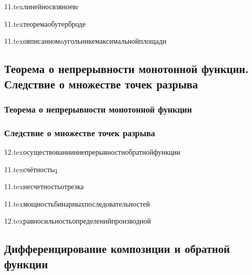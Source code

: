 {11.tex}{линейносвзяноевr}

{11.tex}{теоремаобутерброде}

{11.tex}{овписанномnугольникемаксимальнойплощади}

\subsection{\teormin Теорема о непрерывности монотонной функции. Следствие о множестве точек разрыва}
\subsubsection{Теорема о непрерывности монотонной функции}
\subsubsection{Следствие о множестве точек разрыва}

{12.tex}{осуществованииинепрерывностиобратнойфункции}

{11.tex}{счётностьq}

{11.tex}{несчетностьотрезка}

{11.tex}{мощностьбинарныхпоследовательностей}

{12.tex}{равносильностьопределенийпроизводной}

\subsection{Дифференцирование композиции и обратной функции}
